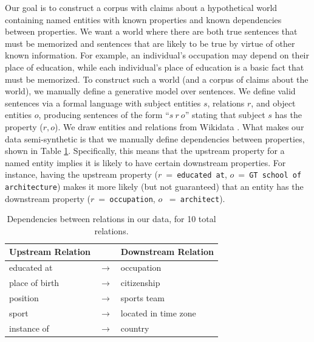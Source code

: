 \documentclass[11pt,a4paper]{article}
\begin{document}
Our goal is to construct a corpus with claims about a hypothetical world containing named entities with known properties and known dependencies between properties. 
We want a world where there are both true sentences that must be memorized and sentences that are likely to be true by virtue of other known information.
For example, an individual's occupation may depend on their place of education, while each individual's place of education is a basic fact that must be memorized.  
To construct such a world (and a corpus of claims about the world), we manually define a generative model over sentences. 
We define valid sentences via a formal language with subject entities $s$, relations $r$, and object entities $o$, producing sentences of the form ``$s \ r \ o$'' stating that subject $s$ has the property ($r, o$). 
We draw entities and relations from Wikidata \citep{vrandevcic2014wikidata, wang2021kepler}. 
What makes our data semi-synthetic is that we manually define dependencies between properties, shown in Table \ref{tab:dependencies}.
Specifically, this means that the upstream property for a named entity implies it is likely to have certain downstream properties. For instance, having the upstream property ($r$~=~\texttt{educated at}, $o$~=~\texttt{GT school of architecture}) makes it more likely (but not guaranteed) that an entity has the downstream property ($r$~=~\texttt{occupation}, $o$~ =~\texttt{architect}).

\begin{table}[h]
  \centering
\begin{tabular}{lcl}
  \hline
  \multicolumn{1}{p{77pt}}{\hspace{-4pt}Upstream Relation} & ~ & \hspace{-8pt} Downstream Relation \\
  \hline
  educated at & $\rightarrow$ & occupation \\
  place of birth & $\rightarrow$ & citizenship\\
  position & $\rightarrow$ & sports team \\
  sport & $\rightarrow$ & located in time zone \\
  instance of & $\rightarrow$ & country \\
  \hline
\end{tabular}
\vspace{-3pt}
\caption{Dependencies between relations in our data, for 10 total relations.}
\label{tab:dependencies}
\end{table}
\end{document}

